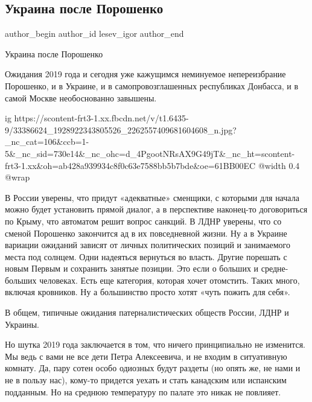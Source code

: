  
 
 
 
 
 
\subsection{Украина после Порошенко}
\label{sec:24_05_2018.fb.lesev_igor.1.ukraina_posle_poroshenko}
 
\ifcmt
 author_begin
   author_id lesev_igor
 author_end
\fi

Украина после Порошенко

Ожидания 2019 года и сегодня уже кажущимся неминуемое непереизбрание Порошенко,
и в Украине, и в самопровозглашенных республиках Донбасса, и в самой Москве
необоснованно завышены.

\ifcmt
  ig https://scontent-frt3-1.xx.fbcdn.net/v/t1.6435-9/33386624_1928922343805526_2262557409681604608_n.jpg?_nc_cat=106&ccb=1-5&_nc_sid=730e14&_nc_ohc=d_4PgootNRsAX9G49jT&_nc_ht=scontent-frt3-1.xx&oh=ab428a939934c8f0c63e7588bb5b7bde&oe=61BB00EC
  @width 0.4
  @wrap 
\fi

В России уверены, что придут «адекватные» сменщики, с которыми для начала можно
будет установить прямой диалог, а в перспективе наконец-то договориться по
Крыму, что автоматом решит вопрос санкций. В ЛДНР уверены, что со сменой
Порошенко закончится ад в их повседневной жизни. Ну а в Украине вариации
ожиданий зависят от личных политических позиций и занимаемого места под
солнцем. Одни надеяться вернуться во власть. Другие порешать с новым Первым и
сохранить занятые позиции. Это если о больших и средне-больших человеках. Есть
еще категория, которая хочет отомстить. Таких много, включая кровников. Ну а
большинство просто хотят «чуть пожить для себя».

В общем, типичные ожидания патерналистических обществ России, ЛДНР и Украины.

Но шутка 2019 года заключается в том, что ничего принципиально не изменится. Мы
ведь с вами не все дети Петра Алексеевича, и не входим в ситуативную комнату.
Да, пару сотен особо одиозных будут раздеты (но опять же, не нами и не в пользу
нас), кому-то придется уехать и стать канадским или испанским подданным. Но на
среднюю температуру по палате это никак не повлияет.

